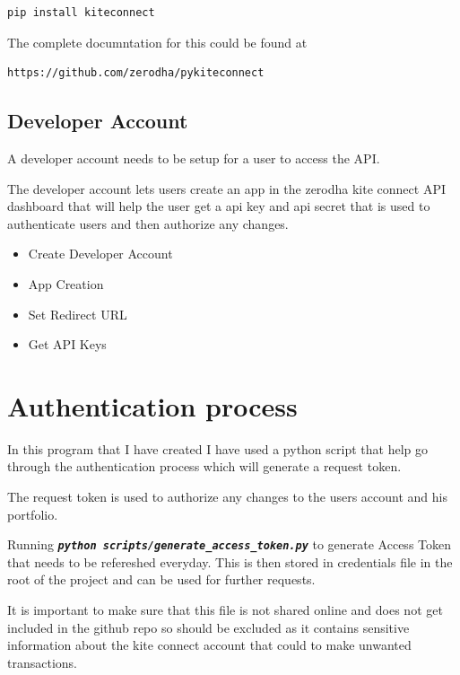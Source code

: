\begin{lstlisting}[language=bash, caption=Installing KiteConnect, basicstyle=\ttfamily\small]
pip install kiteconnect
\end{lstlisting}

The complete documntation for this could be found at 

\begin{lstlisting}[language={}, caption=KiteConnect GitHub Repository URL]
https://github.com/zerodha/pykiteconnect
\end{lstlisting}

\subsection{Developer Account}

A developer account needs to be setup for a user to access the API.

The developer account lets users create an app in the zerodha kite connect API dashboard that will help the user get a api key and api secret that is used to authenticate users and then authorize any changes.

\begin{itemize}
    \item Create Developer Account
    \item App Creation
    \item Set Redirect URL
    \item Get API Keys
\end{itemize}

\section{Authentication process}

In this program that I have created I have used a python script that help go through the authentication process which will generate a request token.

The request token is used to authorize any changes to the users account and his portfolio.

Running \texttt{\textbf{\textit{python scripts/generate\_access\_token.py}}} to generate Access Token that needs to be refereshed everyday. This is then stored in credentials file in the root of the project and can be used for further requests.

It is important to make sure that this file is not shared online and does not get included in the github repo so should be excluded as it contains sensitive information about the kite connect account that could to make unwanted transactions.

